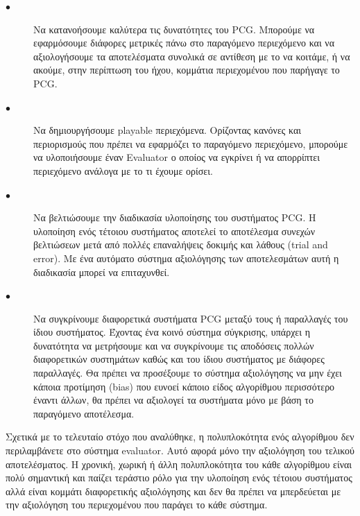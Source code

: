 \begin{description}
  \item[$\bullet$] Να κατανοήσουμε καλύτερα τις δυνατότητες του PCG. Μπορούμε να εφαρμόσουμε διάφορες μετρικές πάνω στο παραγόμενο περιεχόμενο και να αξιολογήσουμε τα αποτελέσματα συνολικά σε αντίθεση με το να κοιτάμε, ή να ακούμε, στην περίπτωση του ήχου, κομμάτια περιεχομένου που παρήγαγε το PCG.
    \item[$\bullet$] Να δημιουργήσουμε playable περιεχόμενα. Ορίζοντας κανόνες και περιορισμούς που πρέπει να εφαρμόζει το παραγόμενο περιεχόμενο, μπορούμε να υλοποιήσουμε έναν Εvaluator ο οποίος να εγκρίνει ή να απορρίπτει περιεχόμενο ανάλογα με το τι έχουμε ορίσει.
    \item[$\bullet$] Να βελτιώσουμε την διαδικασία υλοποίησης του συστήματος PCG. Η υλοποίηση ενός τέτοιου συστήματος αποτελεί το αποτέλεσμα συνεχών βελτιώσεων μετά από πολλές επαναλήψεις δοκιμής και λάθους (trial and error). Με ένα αυτόματο σύστημα αξιολόγησης των αποτελεσμάτων αυτή η διαδικασία μπορεί να επιταχυνθεί.
    \item[$\bullet$] Να συγκρίνουμε διαφορετικά συστήματα PCG μεταξύ τους ή παραλλαγές του ίδιου συστήματος. Έχοντας ένα κοινό σύστημα σύγκρισης, υπάρχει η δυνατότητα να μετρήσουμε και να συγκρίνουμε τις αποδόσεις πολλών διαφορετικών συστημάτων καθώς και του ίδιου συστήματος με διάφορες παραλλαγές. Θα πρέπει να προσέξουμε το σύστημα αξιολόγησης να μην έχει κάποια προτίμηση (bias) που ευνοεί κάποιο είδος αλγορίθμου περισσότερο έναντι άλλων, θα πρέπει να αξιολογεί τα συστήματα μόνο με βάση το παραγόμενο αποτέλεσμα.
\end{description}
\par
Σχετικά με το τελευταίο στόχο που αναλύθηκε, η πολυπλοκότητα ενός αλγορίθμου δεν περιλαμβάνετε στο σύστημα evaluator. Αυτό αφορά μόνο την αξιολόγηση του τελικού αποτελέσματος. Η χρονική, χωρική ή άλλη πολυπλοκότητα του κάθε αλγορίθμου είναι πολύ σημαντική και παίζει τεράστιο ρόλο για την υλοποίηση ενός τέτοιου συστήματος αλλά είναι κομμάτι διαφορετικής αξιολόγησης και δεν θα πρέπει να μπερδεύεται με την αξιολόγηση του περιεχομένου που παράγει το κάθε σύστημα.

